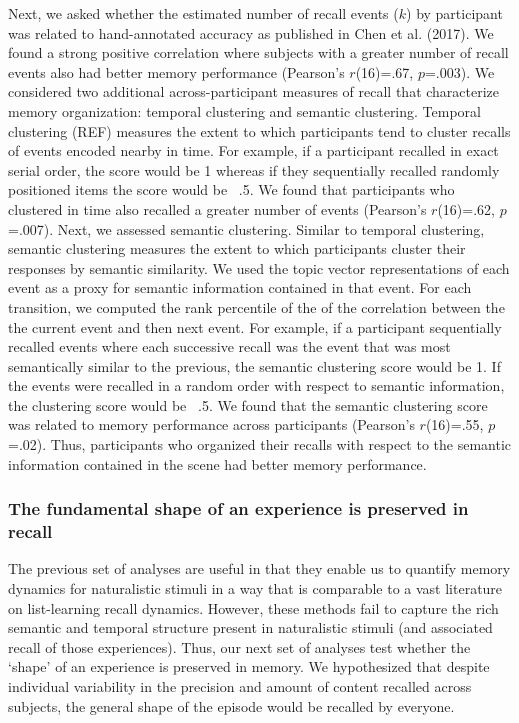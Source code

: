 \documentclass{article}
\begin{document}
{Next, we asked whether the estimated number of recall events ($k$) by participant was related to hand-annotated accuracy as published in Chen et al. (2017).  We found a strong positive correlation where subjects with a greater number of recall events also had better memory performance (Pearson's $r$(16)=.67, $p$=.003).  We considered two additional across-participant measures of recall that characterize memory organization: temporal clustering and semantic clustering. Temporal clustering (REF) measures the extent to which participants tend to cluster recalls of events encoded nearby in time.  For example, if a participant recalled in exact serial order, the score would be 1 whereas if they sequentially recalled randomly positioned items the score would be ~.5.  We found that participants who clustered in time also recalled a greater number of events (Pearson's $r$(16)=.62, $p$=.007). Next, we assessed semantic clustering.  Similar to temporal clustering, semantic clustering measures the extent to which participants cluster their responses by semantic similarity.  We used the topic vector representations of each event as a proxy for semantic information contained in that event.  For each transition, we computed the rank percentile of the of the correlation between the the current event and then next event. For example, if a participant sequentially recalled events where each successive recall was the event that was most semantically similar to the previous, the semantic clustering score would be 1.  If the events were recalled in a random order with respect to semantic information, the clustering score would be ~.5. We found that the semantic clustering score was related to memory performance across participants (Pearson's $r$(16)=.55, $p$=.02).  Thus, participants who organized their recalls with respect to the semantic information contained in the scene had better memory performance.

\subsubsection{The fundamental shape of an experience is preserved in recall}
The previous set of analyses are useful in that they enable us to quantify memory dynamics for naturalistic stimuli in a way that is comparable to a vast literature on list-learning recall dynamics. However, these methods fail to capture the rich semantic and temporal structure present in naturalistic stimuli (and associated recall of those experiences). Thus, our next set of analyses test whether the `shape' of an experience is preserved in memory. We hypothesized that despite individual variability in the precision and amount of content recalled across subjects, the general shape of the episode would be recalled by everyone.

}
\end{document}
